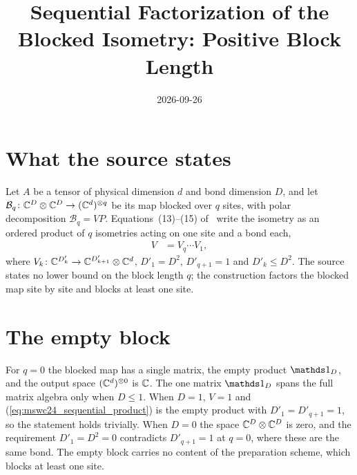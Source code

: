 \documentclass{article}
\title{Sequential Factorization of the Blocked Isometry: Positive Block Length}
\author{}
\date{2026-09-26}
\begin{document}
\maketitle
{}

\section{What the source states}
Let $A$ be a tensor of physical dimension $d$ and bond dimension $D$, and let
$\mathcal B_q\colon\mathbb{C}^D\otimes\mathbb{C}^D\to(\mathbb{C}^d)^{\otimes q}$ be its map blocked
over $q$ sites, with polar decomposition $\mathcal B_q=VP$. Equations~(13)--(15)
of~\cite{Malz2024Preparation} write the isometry as an ordered product of $q$
isometries acting on one site and a bond each,
\begin{align}
    V
     & =V_q\cdots V_1,
    \label{eq:mswc24_sequential_product}
\end{align}
where $V_k\colon\mathbb{C}^{D'_k}\to\mathbb{C}^{D'_{k+1}}\otimes\mathbb{C}^d$, $D'_1=D^2$,
$D'_{q+1}=1$ and $D'_k\leq D^2$. The source states no lower bound on the block
length $q$; the construction factors the blocked map site by site and blocks
at least one site.

\section{The empty block}
For $q=0$ the blocked map has a single matrix, the empty product
$\Id_D$, and the output space $(\mathbb{C}^d)^{\otimes0}$ is $\mathbb{C}$. The one matrix
$\Id_D$ spans the full matrix algebra only when $D\leq1$. When $D=1$,
$V=1$ and (\ref{eq:mswc24_sequential_product}) is the empty product with
$D'_1=D'_{q+1}=1$, so the statement holds trivially. When $D=0$ the space
$\mathbb{C}^D\otimes\mathbb{C}^D$ is zero, and the requirement $D'_1=D^2=0$ contradicts
$D'_{q+1}=1$ at $q=0$, where these are the same bond. The empty block
carries no content of the preparation scheme, which blocks at least one site.
\end{document}
